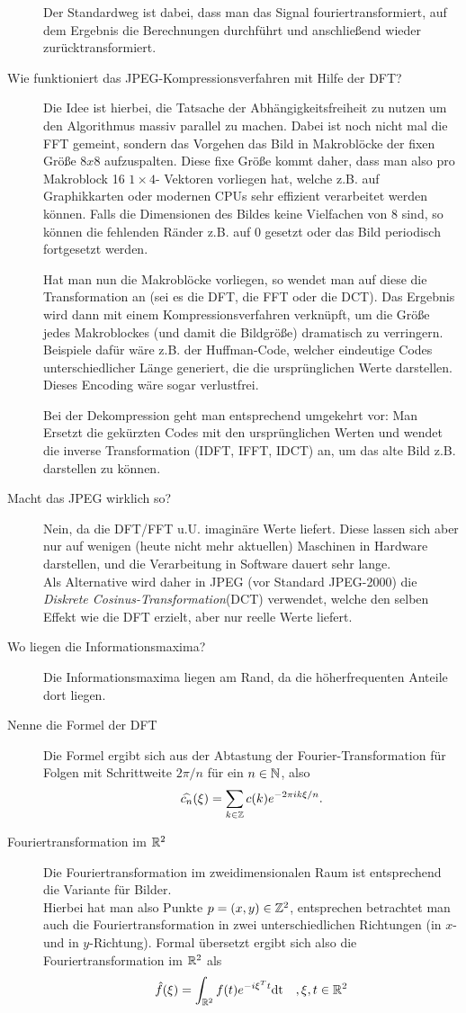 \begin{description}
      Der Standardweg ist dabei, dass man das Signal fouriertransformiert, auf dem Ergebnis die Berechnungen
      durchführt und anschließend wieder zurücktransformiert.
	\item[Wie funktioniert das JPEG-Kompressionsverfahren mit Hilfe der DFT?]
      Die Idee ist hierbei, die Tatsache der Abhängigkeitsfreiheit zu nutzen um den Algorithmus massiv parallel
      zu machen. Dabei ist noch nicht mal die FFT gemeint, sondern das Vorgehen das Bild in Makroblöcke der
      fixen Größe $8x8$ aufzuspalten. Diese fixe Größe kommt daher, dass man also pro Makroblock 16 $1\times 4$-
      Vektoren vorliegen hat, welche z.B. auf Graphikkarten oder modernen CPUs sehr effizient verarbeitet werden
      können. Falls die Dimensionen des Bildes keine Vielfachen von $8$ sind, so können die fehlenden Ränder
      z.B. auf $0$ gesetzt oder das Bild periodisch fortgesetzt werden.

      Hat man nun die Makroblöcke vorliegen, so wendet man auf diese die Transformation an (sei es die DFT, die
      FFT oder die DCT). Das Ergebnis wird dann mit einem Kompressionsverfahren verknüpft, um die Größe jedes
      Makroblockes (und damit die Bildgröße) dramatisch zu verringern. Beispiele dafür wäre z.B. der Huffman-Code,
      welcher eindeutige Codes unterschiedlicher Länge generiert, die die ursprünglichen Werte darstellen. Dieses
      Encoding wäre sogar verlustfrei.

      Bei der Dekompression geht man entsprechend umgekehrt vor: Man Ersetzt die gekürzten Codes mit den ursprünglichen
      Werten und wendet die inverse Transformation (IDFT, IFFT, IDCT) an, um das alte Bild z.B. darstellen zu können.
    \item[Macht das JPEG wirklich so?]
      Nein, da die DFT/FFT u.U. imaginäre Werte liefert. Diese lassen sich aber nur auf wenigen (heute nicht mehr
      aktuellen) Maschinen in Hardware darstellen, und die Verarbeitung in Software dauert sehr lange.\\
      Als Alternative wird daher in JPEG (vor Standard JPEG-2000) die \emph{Diskrete Cosinus-Transformation}(DCT)
      verwendet, welche den selben Effekt wie die DFT erzielt, aber nur reelle Werte liefert.
	\item[Wo liegen die Informationsmaxima?]
      Die Informationsmaxima liegen am Rand, da die höherfrequenten Anteile dort liegen.
	\item[Nenne die Formel der DFT]
  	Die Formel ergibt sich aus der Abtastung der Fourier-Transformation für Folgen mit Schrittweite
  	$ 2\pi / n $ für ein $ n \in \mathbb{N} $, also
  	\[
    	\widehat{c_{n}}(\xi) = \sum_{k \in \mathbb{Z}} c(k) e^{-2\pi i k \xi / n}.
  	\]
	\item[Fouriertransformation im $\mathbb{R}^2$]
      Die Fouriertransformation im zweidimensionalen Raum ist entsprechend die Variante für Bilder.\\
      Hierbei hat man also Punkte $p = (x, y) \in \mathbb{Z}^2$, entsprechen betrachtet man auch die Fouriertransformation
      in zwei unterschiedlichen Richtungen (in $x$- und in $y$-Richtung). Formal übersetzt ergibt sich also die
      Fouriertransformation im $\mathbb{R}^2$ als
      $$ \hat f(\xi) = \int_{\mathbb{R}^2} f(t)e^{-i \xi^T t}\text{dt}\quad, \xi,t\in\mathbb{R}^2 $$
\end{description}
